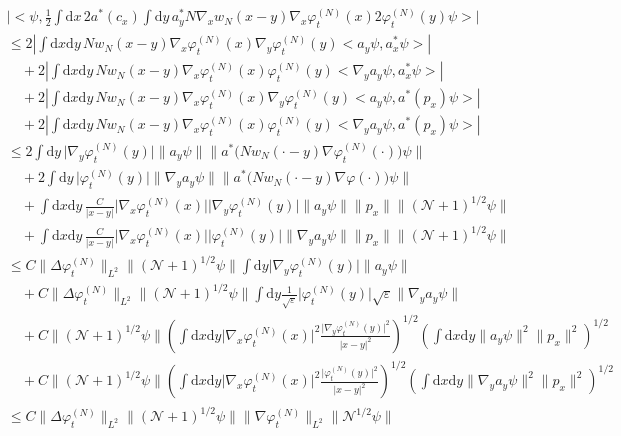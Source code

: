 \documentclass[11pt,a4paper,draft,DIV11]{scrartcl}	%
\newcommand{\di}{\textrm{d}}		%
\newcommand{\Ncal}{\mathcal{N}}		%
\newcommand{\scal}[2]{\big<#1,#2\big>} %
\newcommand{\norm}[1]{\lVert#1\rVert}	%
\newcommand{\ph}{\varphi_t^{(N)}}	%
\begin{document}
\begin{align*}
& \lvert \scal{\psi}{\frac{1}{2}\int \di x\, 2a^\ast(c_x) \int \di y\,a^\ast_y N\nabla_x w_N(x-y)\nabla_x \ph(x) 2\ph(y) \psi}\rvert \\
& \leq 2\left\lvert \int \di x \di y\, Nw_N(x-y) \nabla_x \ph(x)  \nabla_y \ph(y) \scal{a_y\psi}{a^\ast_x\psi} \right\rvert \\
& \quad + 2\left\lvert \int \di x \di y\,  Nw_N(x-y) \nabla_x \ph(x) \ph(y)  \scal{\nabla_y a_y\psi}{a^\ast_x \psi} \right\rvert \\
& \quad + 2\left\lvert \int \di x \di y\, Nw_N(x-y) \nabla_x  \ph(x) \nabla_y \ph(y) \scal{a_y \psi}{a^\ast(p_x)\psi} \right\rvert \\
& \quad + 2\left\lvert \int \di x \di y\, Nw_N(x-y) \nabla_x \ph(x) \ph(y) \scal{\nabla_y a_y\psi}{a^\ast(p_x)\psi} \right\rvert \\
&\leq 2\int \di y\,\lvert \nabla_y \ph(y)\rvert \norm{a_y \psi} \norm{a^\ast\big(Nw_N(\cdot -y)\nabla\ph(\cdot)\big)\psi} \\
& \quad + 2\int \di y\,\lvert \ph(y)\rvert \norm{\nabla_y a_y\psi} \norm{a^\ast\big(Nw_N(\cdot-y)\nabla\varphi(\cdot)\big)\psi} \\
& \quad + \int \di x\di y\, \frac{C}{\lvert x-y\rvert} \lvert \nabla_x\ph(x)\rvert \lvert \nabla_y \ph(y)\rvert \norm{a_y \psi} \norm{p_x} \norm{(\Ncal+1)^{1/2}\psi} \\
& \quad + \int \di x\di y\, \frac{C}{\lvert x-y\rvert} \lvert \nabla_x\ph(x)\rvert \lvert \ph(y)\rvert \norm{\nabla_y a_y\psi} \norm{p_x} \norm{(\Ncal+1)^{1/2}\psi} \\
&\leq C \norm{\Delta\ph}_{L^2} \norm{(\Ncal+1)^{1/2}\psi} \int \di y \lvert \nabla_y \ph(y) \rvert \norm{a_y \psi} \\
& \quad + C \norm{\Delta \ph}_{L^2} \norm{(\Ncal+1)^{1/2}\psi} \int \di y \frac{1}{\sqrt{\varepsilon}} \lvert \ph(y)\rvert \sqrt{\varepsilon} \norm{\nabla_y a_y\psi} \\
& \quad + C \norm{(\Ncal+1)^{1/2}\psi} \left(\int \di x\di y \lvert \nabla_x\ph(x)\rvert^2 \frac{\lvert\nabla_y \ph(y)\rvert^2}{\lvert x-y \rvert^2} \right)^{1/2} \left(\int \di x\di y \norm{a_y \psi}^2 \norm{p_x}^2 \right)^{1/2} \\
& \quad + C \norm{(\Ncal+1)^{1/2}\psi} \left(\int \di x\di y \lvert \nabla_x\ph(x)\rvert^2 \frac{\lvert \ph(y)\rvert^2}{\lvert x-y\rvert^2} \right)^{1/2} \left(\int \di x\di y \norm{\nabla_y a_y\psi}^2 \norm{p_x}^2 \right)^{1/2} \\
& \leq C \norm{\Delta \ph}_{L^2} \norm{(\Ncal+1)^{1/2}\psi} \norm{\nabla \ph}_{L^2} \norm{\Ncal^{1/2}\psi} \\

\end{align*}
\end{document}
